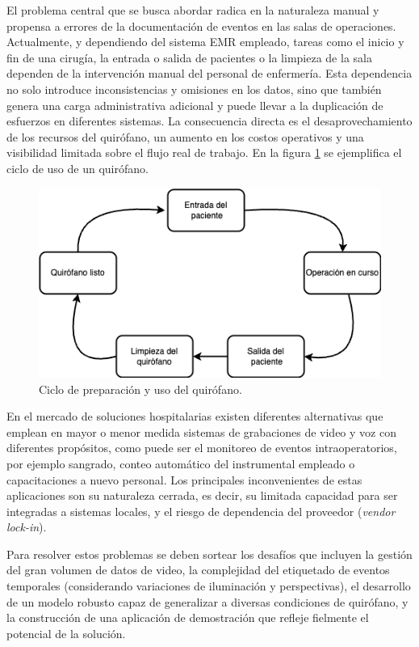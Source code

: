 \documentclass[
11pt, %
]{charter}
\begin{document}
El problema central que se busca abordar radica en la naturaleza manual y propensa a errores de la documentación de eventos en las salas de operaciones. Actualmente, y dependiendo del sistema EMR empleado, tareas como el inicio y fin de una cirugía, la entrada o salida de pacientes o la limpieza de la sala dependen de la intervención manual del personal de enfermería. Esta dependencia no solo introduce inconsistencias y omisiones en los datos, sino que también genera una carga administrativa adicional y puede llevar a la duplicación de esfuerzos en diferentes sistemas. La consecuencia directa es el desaprovechamiento de los recursos del quirófano, un aumento en los costos operativos y una visibilidad limitada sobre el flujo real de trabajo. En la figura \ref{fig:lifecycle} se ejemplifica el ciclo de uso de un quirófano.

\begin{figure}[htpb]
	\centering 
	\includegraphics[width=.6\textwidth]{./Figuras/lifecycle.png}
	\caption{Ciclo de preparación y uso del quirófano.}
	\label{fig:lifecycle}
\end{figure}

En el mercado de soluciones hospitalarias existen diferentes alternativas que emplean en mayor o menor medida sistemas de grabaciones de video y voz con diferentes propósitos, como puede ser el monitoreo de eventos intraoperatorios, por ejemplo sangrado, conteo automático del instrumental empleado o capacitaciones a nuevo personal. Los principales inconvenientes de estas aplicaciones son su naturaleza cerrada, es decir, su limitada capacidad para ser integradas a sistemas locales, y el riesgo de dependencia del proveedor (\textit{vendor lock-in}).

Para resolver estos problemas se deben sortear los desafíos que incluyen la gestión del gran volumen de datos de video, la complejidad del etiquetado de eventos temporales (considerando variaciones de iluminación y perspectivas), el desarrollo de un modelo robusto capaz de generalizar a diversas condiciones de quirófano, y la construcción de una aplicación de demostración que refleje fielmente el potencial de la solución.
\end{document}
